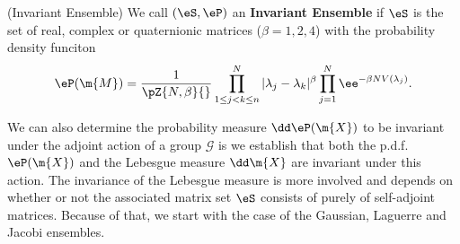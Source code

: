 \begin{definicao} (Invariant Ensemble)
	We call $(\eS, \eP)$ an \textbf{Invariant Ensemble} if $\eS$ is the set of real, complex or quaternionic matrices ($\beta = 1, 2, 4$) with the probability density funciton
	\begin{equation}
		\eP(\m{M}) = \frac{1}{\pZ{N,\beta}{}}\prod_{1\leq j < k \leq n}^N |\lambda_j - \lambda_k|^\beta \prod_{j=1}^{N} \ee^{- \beta N V(\lambda_j)}.
	\end{equation}
	\label{Definition: Invariant}
\end{definicao}

We can also determine the probability measure $\dd \eP(\m{X})$ to be invariant under the adjoint action of a group $\mathcal{G}$ is we establish that both the p.d.f. $\eP(\m{X})$ and the Lebesgue measure $\dd \m{X}$ are invariant under this action. The invariance of the Lebesgue measure is more involved and depends on whether or not the associated matrix set $\eS$ consists of purely of self-adjoint matrices. Because of that, we start with the case of the Gaussian, Laguerre and Jacobi ensembles.





